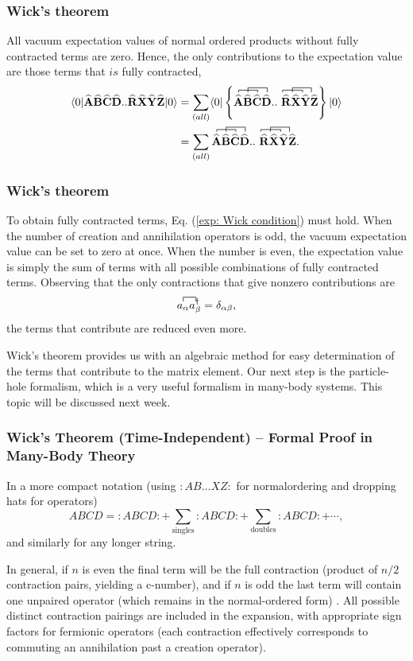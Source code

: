 \documentclass{beamer}
\newcommand*{\cre}[1]{a^{\dagger}_{#1}}
\newcommand*{\an}[1]{a_{#1}}
\newcommand*{\for}[3]{\langle#1|#2|#3\rangle}
\newcommand*{\kpr}[1]{\left\{#1\right\}}
\newcommand{\OP}[1]{{\bf\widehat{#1}}}
\newcommand*{\pr}[1]{\left(#1\right)}
\begin{document}
\frame
{
  \frametitle{Wick's theorem}
\begin{small}
{\scriptsize
All vacuum expectation values of normal ordered products without fully contracted terms are zero. Hence, the only contributions to the expectation value are those terms that $\textit{is}$ fully contracted,
\begin{align}
\for{0}{\OP{A}\OP{B}\OP{C}\OP{D}..\OP{R}\OP{X}\OP{Y}\OP{Z}}{0} &= \sum_{\pr{all}} \for{0}{\kpr{\contraction[0.5ex]{}{\OP{A}}{\OP{B}}{\OP{C}}\contraction[1.0ex]{\OP{A}}{\OP{B}}{\OP{C}}{\OP{D}} \OP{A}\OP{B}\OP{C}\OP{D}..\contraction[0.5ex]{}{\OP{R}}{\OP{X}}{\OP{Y}}\contraction[1.0ex]{\OP{R}}{\OP{X}}{\OP{Y}}{\OP{Z}}\ \OP{R}\OP{X}\OP{Y}\OP{Z}}}{0}\\
&= \sum_{\pr{all}} \contraction[0.5ex]{}{\OP{A}}{\OP{B}}{\OP{C}}\contraction[1.0ex]{\OP{A}}{\OP{B}}{\OP{C}}{\OP{D}} \OP{A}\OP{B}\OP{C}\OP{D}..\contraction[0.5ex]{}{\OP{R}}{\OP{X}}{\OP{Y}}\contraction[1.0ex]{\OP{R}}{\OP{X}}{\OP{Y}}{\OP{Z}}\ \OP{R}\OP{X}\OP{Y}\OP{Z}.
\end{align}
}
\end{small}
}

\frame
{
  \frametitle{Wick's theorem}
\begin{small}
{\scriptsize
To obtain fully contracted terms, Eq. (\ref{exp: Wick condition}) must hold. When the number of creation and annihilation operators is odd, the vacuum expectation value can be set to zero at once. When the number is even, the expectation value is simply the sum of terms with all possible combinations of fully contracted terms. Observing that the only contractions that give nonzero contributions are 
\begin{align}
\contraction{}{\an{\alpha}}{}{\cre{\beta}}
\an{\alpha}\cre{\beta} = \delta_{\alpha \beta},
\end{align}
the terms that contribute are reduced even more.

Wick's theorem provides us with an algebraic method for easy determination of the terms that contribute to the matrix element. Our next step is the particle-hole formalism, which is a very useful formalism in many-body systems. This topic will be discussed next week.
}
\end{small}
}




\frame
{
\frametitle{Wick’s Theorem (Time-Independent) – Formal Proof in Many-Body Theory}
\begin{small}
{\scriptsize
In a more compact notation (using $:AB\dots XZ:$ for normalordering and dropping hats for operators)
\[
ABCD =:ABCD: + \sum_{\text{singles}} :ABCD: + \sum_{\text{doubles}} :ABCD: + \cdots,
\]
and similarly for any longer string.

In general, if $n$ is even the final term will be the full contraction (product of $n/2$ contraction pairs, yielding a c-number), and if $n$ is odd the last term will contain one unpaired operator (which remains in the normal-ordered form) . All possible distinct contraction pairings are included in the expansion, with appropriate sign factors for fermionic operators (each contraction effectively corresponds to commuting an annihilation past a creation operator).


}
\end{small}
}
\end{document}
